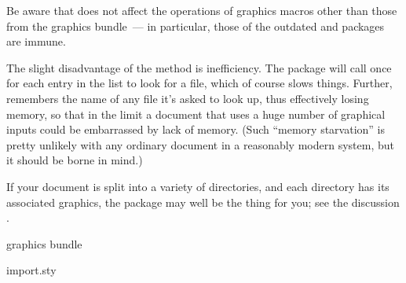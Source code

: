 Be aware that  does not affect the operations of
graphics macros other than those from the graphics bundle~--- in
particular, those of the outdated  and
 packages are immune.

The slight disadvantage of the  method is
inefficiency.  The package will call \AllTeX{} once for each entry in
the list to look for a file, which of course slows things.  Further,
\AllTeX{} remembers the name of any file it's asked to look up, thus
effectively losing memory, so that in the limit a document that uses a
huge number of graphical inputs could be embarrassed by lack of
memory.  (Such ``memory starvation'' is pretty unlikely with any
ordinary document in a reasonably modern \AllTeX{} system, but it
should be borne in mind.)

If your document is split into a variety of directories, and each
directory has its associated graphics, the  package
may well be the thing for you; see the discussion %
%
%
.
\begin{ctanrefs}
\item[graphics \nothtml{\rmfamily}bundle]
\item[import.sty]
\end{ctanrefs}


